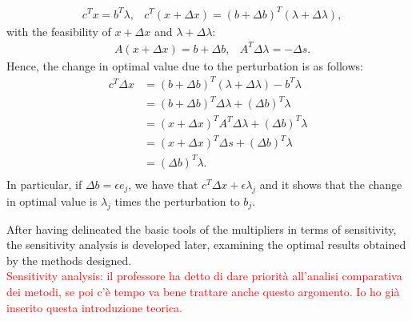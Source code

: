 \documentclass[a4paper,10 pt,titlepage,twoside]{book}
\theoremstyle{plain}
\theoremstyle{definition}
\theoremstyle{remark}
\begin{document}
\begin{align*}
&c^{T}x=b^{T}\lambda,  &c^{T}(x + \Delta x)=\left(b+\Delta b\right)^{T}\left(\lambda+\Delta \lambda\right),
\end{align*}
with the feasibility of $x + \Delta x$ and $\lambda+\Delta \lambda$:
\begin{align*}
&A(x + \Delta x)=b+\Delta b,
&A^{T}\Delta\lambda=-\Delta s.
\end{align*}
Hence, the change in optimal value due to the perturbation is as follows:
\begin{align*}
c^{T}\Delta x&=\left(b+\Delta b\right)^{T}\left(\lambda+\Delta \lambda\right) - b^{T}\lambda\\
&=\left(b+\Delta b\right)^{T}\Delta \lambda+\left(\Delta b\right)^{T}\lambda\\
&=\left(x+\Delta x\right)^{T}A^{T}\Delta \lambda+\left(\Delta b\right)^{T}\lambda\\
&=\left(x+\Delta x\right)^{T}\Delta s+\left(\Delta b\right)^{T}\lambda\\
&=\left(\Delta b\right)^{T}\lambda.\\
\end{align*} 
In particular, if $\Delta b = \epsilon e_{j}$, we have that $c^{T}\Delta x+\epsilon \lambda_{j}$ and it shows that the change in optimal value is $\lambda_{j}$ times the perturbation to $b_{j}$.

After having delineated the basic tools of the multipliers in terms of sensitivity, the sensitivity analysis is developed later, examining the optimal results obtained by the methods designed.\\
\textcolor{red}{Sensitivity analysis: il professore ha detto di dare priorità all'analisi comparativa dei metodi, se poi c'è tempo va bene trattare anche questo argomento. Io ho già inserito questa introduzione teorica.}
%
%
\end{document}
